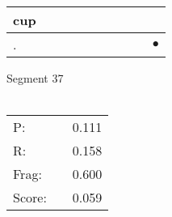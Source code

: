 \documentclass[landscape]{article}
\newcommand{\ssp}{\hspace{2pt}}
\newcommand{\mex}{\cellcolor{g}$\bullet$}
\begin{document}
\begin{tabular}{|l|p{10pt}|p{10pt}|p{10pt}|p{10pt}|p{10pt}|p{10pt}|p{10pt}|p{10pt}|p{10pt}|}
\hline
\ssp cup \ssp&\hspace{2pt}&\hspace{2pt}&\hspace{2pt}&\hspace{2pt}&\hspace{2pt}&\hspace{2pt}&\hspace{2pt}&\hspace{2pt}&\hspace{2pt}\\
\hline
\ssp \cellcolor{ref8}. \ssp&\hspace{2pt}&\hspace{2pt}&\hspace{2pt}&\hspace{2pt}&\hspace{2pt}&\hspace{2pt}&\hspace{2pt}&\hspace{2pt}&\hspace{2pt}\mex\\
\hline
\end{tabular}

\vspace{6pt}
\noindent Segment 37\\\\
\noindent\begin{tabular}{lm{12pt}r}
\hline
P:&&0.111\\
R:&&0.158\\
Frag:&&0.600\\
Score:&&0.059\\
\end{tabular}

\newpage
\end{document}
